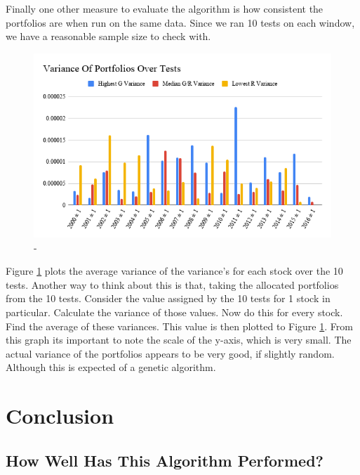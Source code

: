 \documentclass[11pt]{article}
\begin{document}
    Finally one other measure to evaluate the algorithm is how consistent the portfolios
    are when run on the same data. Since we ran 10 tests on each window, we have a reasonable
    sample size to check with.

    \begin{figure}[H] %
        \includegraphics[width=\textwidth]{VarianceOfPortfoliosOverTests}
        \caption{-}
            \label{fig:VarianceOfPortfoliosOverTests}
    \end{figure}

    Figure \ref{fig:VarianceOfPortfoliosOverTests} plots the average variance of the variance's for
    each stock over the 10 tests. Another way to think about this is that, taking the allocated
    portfolios from the 10 tests. Consider the value assigned by the 10 tests for 1 stock in
    particular. Calculate the variance of those values. Now do this for every stock. Find the
    average of these variances. This value is then plotted to Figure
    \ref{fig:VarianceOfPortfoliosOverTests}. From this graph its important to note the scale of
    the y-axis, which is very small. The actual variance of the portfolios appears to be very
    good, if slightly random. Although this is expected of a genetic algorithm.

\section{Conclusion}

\subsection{How Well Has This Algorithm Performed?}
\end{document}
